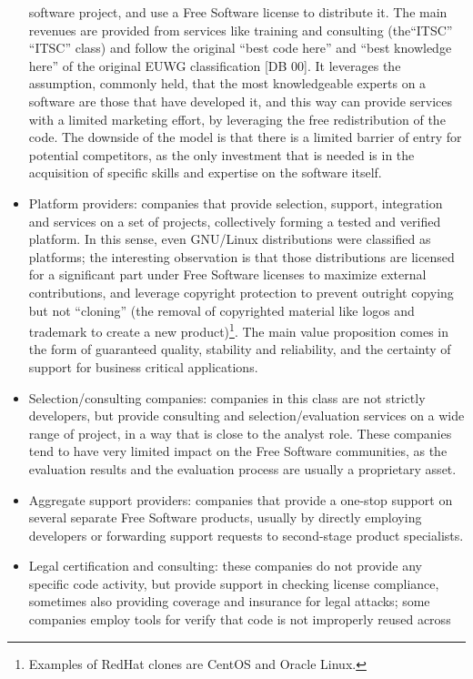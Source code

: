 \begin{itemize}
software project, and use a Free Software license to distribute it. The main
revenues are provided from services like training and consulting (the“ITSC” ``ITSC''
class) and follow the original ``best code here'' and ``best knowledge here'' of the
original EUWG classification [DB 00]. It leverages the assumption, commonly
held, that the most knowledgeable experts on a software are those that have
developed it, and this way can provide services with a limited marketing effort,
by leveraging the free redistribution of the code. The downside of the model is
that there is a limited barrier of entry for potential competitors, as the only
investment that is needed is in the acquisition of specific skills and expertise
on the software itself.
 \item Platform providers: companies that provide selection, support,
integration and services on a set of projects, collectively forming a tested and
verified platform. In this sense, even GNU/Linux distributions were classified
as platforms; the interesting observation is that those distributions are
licensed for a significant part under Free Software licenses to maximize
external contributions, and leverage copyright protection to prevent outright
copying but not ``cloning'' (the removal of copyrighted material like logos and
trademark to create a new product)\footnote{Examples of RedHat clones are CentOS
and Oracle Linux.}. The main value proposition comes in the
form of guaranteed quality, stability and reliability, and the certainty of
support for business critical applications.
 \item Selection/consulting companies: companies in this class are not strictly
developers, but provide consulting and selection/evaluation services on a wide
range of project, in a way that is close to the analyst role. These companies
tend to have very limited impact on the Free Software communities, as the
evaluation results and the evaluation process are usually a proprietary asset.
 \item Aggregate support providers: companies that provide a one-stop support on
several separate Free Software products, usually by directly employing
developers or forwarding support requests to second-stage product specialists.
 \item Legal certification and consulting: these companies do not provide any
specific code activity, but provide support in checking license compliance,
sometimes also providing coverage and insurance for legal attacks; some
companies employ tools for verify that code is not improperly reused across

\end{itemize}
